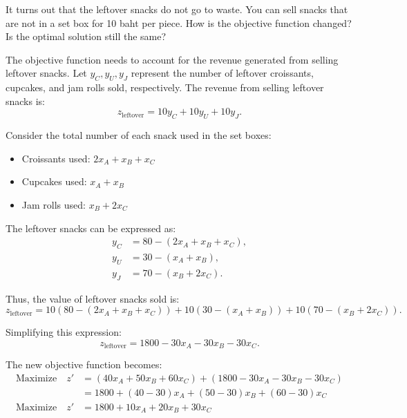 \documentclass[a4paper, 10pt]{article}
\begin{document}

\newpage

\begin{subproblems_alpha}[start=2]
    \item It turns out that the leftover snacks do not go to waste.
    You can sell snacks that are not in a set box for 10 baht per piece.
    How is the objective function changed?
    Is the optimal solution still the same?
\end{subproblems_alpha}

\begin{solution}
The objective function needs to account for the revenue generated from selling leftover snacks.
Let \( y_C, y_U, y_J \) represent the number of leftover croissants, cupcakes, and jam rolls sold, respectively.
The revenue from selling leftover snacks is:
\[ z_{\text{leftover}} = 10y_C + 10y_U + 10y_J. \]

Consider the total number of each snack used in the set boxes:
\begin{itemize}
    \item Croissants used: \( 2x_A + x_B + x_C \)
    \item Cupcakes used: \( x_A + x_B \)
    \item Jam rolls used: \( x_B + 2x_C \)
\end{itemize}

The leftover snacks can be expressed as:
\begin{align*}
y_C & = 80 - (2x_A + x_B + x_C), \\
y_U & = 30 - (x_A + x_B), \\
y_J & = 70 - (x_B + 2x_C).
\end{align*}

Thus, the value of leftover snacks sold is:
\[ z_{\text{leftover}} = 10(80 - (2x_A + x_B + x_C)) + 10(30 - (x_A + x_B)) + 10(70 - (x_B + 2x_C)). \]

Simplifying this expression:
\[ z_{\text{leftover}} = 1800 - 30x_A - 30x_B - 30x_C. \]

The new objective function becomes:
\begin{align*}
    \text{Maximize} \quad z' &= (40x_A + 50x_B + 60x_C) + (1800 - 30x_A - 30x_B - 30x_C) \\
    &= 1800 + (40 - 30)x_A + (50 - 30)x_B + (60 - 30)x_C \\
    \text{Maximize} \quad z' &= 1800 + 10x_A + 20x_B + 30x_C
\end{align*}


\end{solution}
\end{document}
